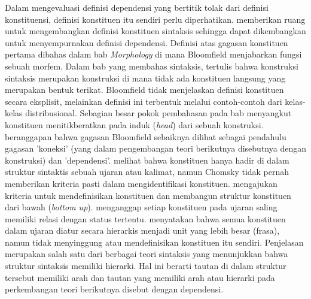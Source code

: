 Dalam mengevaluasi definisi dependensi yang bertitik tolak dari definisi konstituensi, definisi konstituen itu sendiri perlu diperhatikan. \cite{bloomfield1933language} memberikan ruang untuk mengembangkan definisi konstituen sintaksis sehingga dapat dikembangkan untuk menyempurnakan definisi dependensi. Definisi \cite{bloomfield1933language} atas gagasan konstituen pertama dibahas dalam bab \textit{Morphology} di mana Bloomfield menjabarkan fungsi sebuah morfem. Dalam bab yang membahas sintaksis, tertulis bahwa konstruksi sintaksis merupakan konstruksi di mana tidak ada konstituen langsung yang merupakan bentuk terikat. Bloomfield tidak menjelaskan definisi konstituen secara eksplisit, melainkan definisi ini terbentuk melalui contoh-contoh dari kelas-kelas distribusional. Sebagian besar pokok pembahasan pada bab menyangkut konstituen menitikberatkan pada induk (\textit{head}) dari sebuah konstruksi. \cite{gerdes2013defining} beranggapan bahwa gagasan Bloomfield sebaiknya dilihat sebagai pendahulu gagasan 'koneksi' (yang dalam pengembangan teori berikutnya disebutnya dengan konstruksi) dan 'dependensi'. \cite{chomsky1986barriers} melihat bahwa konstituen hanya hadir di dalam struktur sintaktis sebuah ujaran atau kalimat, namun Chomsky tidak pernah memberikan kriteria pasti dalam mengidentifikasi konstituen. \cite{gleason1961introduction} mengajukan kriteria untuk mendefinisikan konstituen dan membangun struktur konstituen dari bawah (\textit{bottom up}). \cite{gleason1961introduction} menganggap setiap konstituen pada ujaran saling memiliki relasi dengan status tertentu. \cite{haegeman1994introduction} menyatakan bahwa semua konstituen dalam ujaran diatur secara hierarkis menjadi unit yang lebih besar (frasa), namun tidak menyinggung atau mendefinisikan konstituen itu sendiri. Penjelasan \cite{haegeman1994introduction} merupakan salah satu dari berbagai teori sintaksis yang menunjukkan bahwa struktur sintaksis memiliki hierarki. Hal ini berarti tautan di dalam struktur tersebut memiliki arah dan tautan yang memiliki arah atau hierarki pada perkembangan teori berikutnya disebut dengan  dependensi. 


